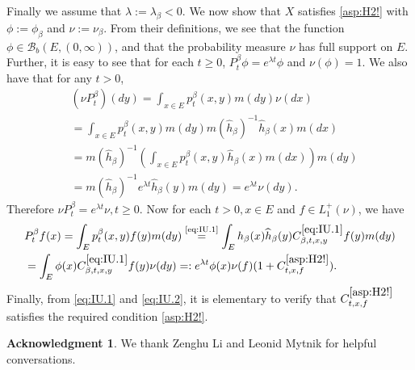 \documentclass[12pt,a4paper]{amsart}
\numberwithin{equation}{section}
\theoremstyle{plain}
\theoremstyle{definition}
\newtheorem*{acknowledgment*}{Acknowledgment}
\theoremstyle{remark}
\begin{document}
	Finally we assume that $\lambda := \lambda_\beta < 0$. We now show that $X$ satisfies \eqref{asp:H2!} with $\phi:=\phi_\beta$ and $\nu:= \nu_\beta$.
	From their definitions, we see that the function $\phi \in \mathcal B_b(E,(0,\infty))$, and that the probability measure $\nu$ has full support on $E$.
	Further, it is easy to see that for each $t\geq 0$, $P_t^\beta \phi = e^{\lambda t}\phi$ and $\nu(\phi) = 1$.
	We also have that for any $t>0$,
\begin{align}
	&(\nu P_t^\beta)(dy) = \int_{x\in E}p_{t}^\beta(x,y)m(dy) \nu(dx)
	\\&= \int_{x\in E}p_{t}^\beta(x,y)m(dy) m(\widehat h_\beta)^{-1}\widehat h_\beta(x)m(dx)
	\\&=  m(\widehat h_\beta)^{-1}  \left(\int_{x\in E} p_t^\beta(x,y) \widehat h_\beta(x) m(dx) \right) m(dy)
	\\& = m(\widehat h_\beta)^{-1} e^{\lambda t}\widehat h_\beta(y) m(dy) =
	e^{\lambda t}\nu(dy).
\end{align}
	Therefore $\nu P_t^\beta = e^{\lambda t}\nu, t\geq 0$. Now for each $t>0, x \in E$ and $f\in L_1^+(\nu)$, we have
\begin{align}
	&P_t^\beta f(x) = \int_{E} p^\beta_t(x,y) f(y)m(dy)
	\overset{\text{\eqref{eq:IU.1}}}= \int_{E} h_\beta (x) \widehat h_\beta (y) C^{\eqref{eq:IU.1}}_{\beta,t,x,y} f(y) m(dy)
	\\&= \int_{E} \phi (x)  C^{\eqref{eq:IU.1}}_{\beta,t,x,y} f(y) \nu(dy)
	=: e^{\lambda t} \phi(x) \nu(f) (1+ C^{\eqref{asp:H2!}}_{t,x,f}).
\end{align}
	Finally, from \eqref{eq:IU.1} and \eqref{eq:IU.2}, it is elementary to verify that $C^{\eqref{asp:H2!}}_{t,x,f}$ satisfies the required condition \eqref{asp:H2!}.

\begin{acknowledgment*}
	We thank Zenghu Li and Leonid Mytnik for helpful conversations.
\end{acknowledgment*}
\end{document}
